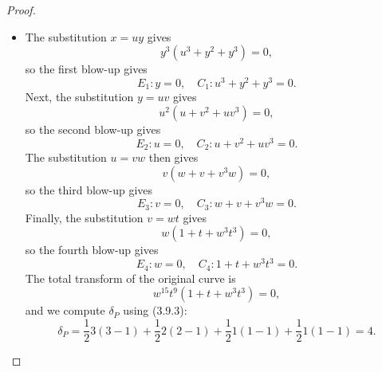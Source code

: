 \documentclass[a4paper]{article}
\begin{document}
\begin{enumerate} [label=\textbf{\arabic*.}, leftmargin=0em]
\begin{proof}
\begin{itemize} [leftmargin=0cm]
                  \item[(d)] The substitution $x = uy$ gives
                        \begin{equation*}
                            y^3(u^3 + y^2 + y^3) = 0,
                        \end{equation*}
                        so the first blow-up gives
                        \begin{equation*}
                            E_1 : y = 0, \quad C_1 : u^3 + y^2 + y^3 = 0.
                        \end{equation*}
                        Next, the substitution $y = uv$ gives
                        \begin{equation*}
                            u^2(u + v^2 + uv^3) = 0,
                        \end{equation*}
                        so the second blow-up gives
                        \begin{equation*}
                            E_2 : u = 0, \quad C_2 : u + v^2 + uv^3 = 0.
                        \end{equation*}
                        The substitution $u = vw$ then gives
                        \begin{equation*}
                            v(w + v + v^3 w) = 0,
                        \end{equation*}
                        so the third blow-up gives
                        \begin{equation*}
                            E_3 : v = 0, \quad C_3 : w + v + v^3w = 0.
                        \end{equation*}
                        Finally, the substitution $v = wt$ gives
                        \begin{equation*}
                            w(1 + t + w^3t^3) = 0,
                        \end{equation*}
                        so the fourth blow-up gives
                        \begin{equation*}
                            E_4 : w = 0, \quad C_4 : 1 + t + w^3t^3 = 0.
                        \end{equation*}
                        The total transform of the original curve is
                        \begin{equation*}
                            w^{15}t^9(1 + t + w^3t^3) = 0,
                        \end{equation*}
                        and we compute $\delta_P$ using (3.9.3):
                        \begin{equation*}
                            \delta_P = \frac{1}{2}3(3 - 1) + \frac{1}{2}2(2 - 1) + \frac{1}{2}1(1 - 1) + \frac{1}{2}1(1 - 1) = 4.
                        \end{equation*}


\end{itemize}
\end{proof}
\end{enumerate}
\end{document}
